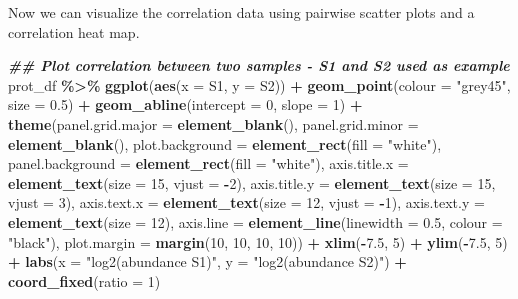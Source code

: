 \documentclass[9pt,a4paper,]{extarticle}
\newenvironment{Shaded}{\begin{snugshade}}{\end{snugshade}}
\newcommand{\AttributeTok}[1]{\textcolor[rgb]{0.13,0.29,0.53}{#1}}
\newcommand{\DecValTok}[1]{\textcolor[rgb]{0.00,0.00,0.81}{#1}}
\newcommand{\DocumentationTok}[1]{\textcolor[rgb]{0.56,0.35,0.01}{\textbf{\textit{#1}}}}
\newcommand{\FloatTok}[1]{\textcolor[rgb]{0.00,0.00,0.81}{#1}}
\newcommand{\FunctionTok}[1]{\textcolor[rgb]{0.13,0.29,0.53}{\textbf{#1}}}
\newcommand{\NormalTok}[1]{#1}
\newcommand{\SpecialCharTok}[1]{\textcolor[rgb]{0.81,0.36,0.00}{\textbf{#1}}}
\newcommand{\StringTok}[1]{\textcolor[rgb]{0.31,0.60,0.02}{#1}}
\begin{document}
Now we can visualize the correlation data using pairwise scatter plots and a
correlation heat map.

\begin{Shaded}
\begin{Highlighting}[]
\DocumentationTok{\#\# Plot correlation between two samples {-} S1 and S2 used as example}
\NormalTok{prot\_df }\SpecialCharTok{\%\textgreater{}\%}
  \FunctionTok{ggplot}\NormalTok{(}\FunctionTok{aes}\NormalTok{(}\AttributeTok{x =} \StringTok{\textasciigrave{}}\AttributeTok{S1}\StringTok{\textasciigrave{}}\NormalTok{, }\AttributeTok{y =} \StringTok{\textasciigrave{}}\AttributeTok{S2}\StringTok{\textasciigrave{}}\NormalTok{)) }\SpecialCharTok{+}
  \FunctionTok{geom\_point}\NormalTok{(}\AttributeTok{colour =} \StringTok{"grey45"}\NormalTok{, }\AttributeTok{size =} \FloatTok{0.5}\NormalTok{) }\SpecialCharTok{+}
  \FunctionTok{geom\_abline}\NormalTok{(}\AttributeTok{intercept =} \DecValTok{0}\NormalTok{, }\AttributeTok{slope =} \DecValTok{1}\NormalTok{) }\SpecialCharTok{+}
  \FunctionTok{theme}\NormalTok{(}\AttributeTok{panel.grid.major =} \FunctionTok{element\_blank}\NormalTok{(), }
        \AttributeTok{panel.grid.minor =} \FunctionTok{element\_blank}\NormalTok{(),}
        \AttributeTok{plot.background =} \FunctionTok{element\_rect}\NormalTok{(}\AttributeTok{fill =} \StringTok{"white"}\NormalTok{),}
        \AttributeTok{panel.background =} \FunctionTok{element\_rect}\NormalTok{(}\AttributeTok{fill =} \StringTok{"white"}\NormalTok{),}
        \AttributeTok{axis.title.x =} \FunctionTok{element\_text}\NormalTok{(}\AttributeTok{size =} \DecValTok{15}\NormalTok{, }\AttributeTok{vjust =} \SpecialCharTok{{-}}\DecValTok{2}\NormalTok{),}
        \AttributeTok{axis.title.y =} \FunctionTok{element\_text}\NormalTok{(}\AttributeTok{size =} \DecValTok{15}\NormalTok{, }\AttributeTok{vjust =} \DecValTok{3}\NormalTok{),}
        \AttributeTok{axis.text.x =} \FunctionTok{element\_text}\NormalTok{(}\AttributeTok{size =} \DecValTok{12}\NormalTok{, }\AttributeTok{vjust =} \SpecialCharTok{{-}}\DecValTok{1}\NormalTok{),}
        \AttributeTok{axis.text.y =} \FunctionTok{element\_text}\NormalTok{(}\AttributeTok{size =} \DecValTok{12}\NormalTok{),}
        \AttributeTok{axis.line =} \FunctionTok{element\_line}\NormalTok{(}\AttributeTok{linewidth =} \FloatTok{0.5}\NormalTok{, }\AttributeTok{colour =} \StringTok{"black"}\NormalTok{),}
        \AttributeTok{plot.margin =} \FunctionTok{margin}\NormalTok{(}\DecValTok{10}\NormalTok{, }\DecValTok{10}\NormalTok{, }\DecValTok{10}\NormalTok{, }\DecValTok{10}\NormalTok{)) }\SpecialCharTok{+}
  \FunctionTok{xlim}\NormalTok{(}\SpecialCharTok{{-}}\FloatTok{7.5}\NormalTok{, }\DecValTok{5}\NormalTok{) }\SpecialCharTok{+}
  \FunctionTok{ylim}\NormalTok{(}\SpecialCharTok{{-}}\FloatTok{7.5}\NormalTok{, }\DecValTok{5}\NormalTok{) }\SpecialCharTok{+}
  \FunctionTok{labs}\NormalTok{(}\AttributeTok{x =} \StringTok{"log2(abundance S1)"}\NormalTok{, }\AttributeTok{y =} \StringTok{"log2(abundance S2)"}\NormalTok{) }\SpecialCharTok{+}
  \FunctionTok{coord\_fixed}\NormalTok{(}\AttributeTok{ratio =} \DecValTok{1}\NormalTok{)}
\end{Highlighting}
\end{Shaded}
\end{document}
